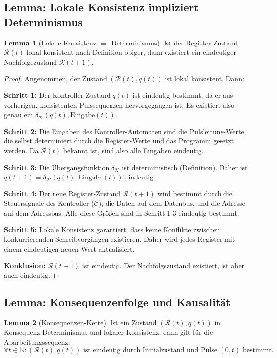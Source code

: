 \documentclass[a4paper,12pt]{article}
\theoremstyle{definition}
\newtheorem{lemma}{Lemma}
\begin{document}
\subsection{Lemma: Lokale Konsistenz impliziert Determinismus}

\begin{lemma}[Lokale Konsistenz $\Rightarrow$ Determinismus]
	\label{lem:lokale_konsistenz}
	Ist der Register-Zustand $\mathcal{R}(t)$ lokal konsistent nach Definition obiger, dann existiert ein eindeutiger Nachfolgezustand $\mathcal{R}(t+1)$.
\end{lemma}

\begin{proof}
	Angenommen, der Zustand $(\mathcal{R}(t), q(t))$ ist lokal konsistent. Dann:
	
	\textbf{Schritt 1:} Der Kontroller-Zustand $q(t)$ ist eindeutig bestimmt, da er aus vorherigen, konsistenten Pulssequenzen hervorgegangen ist. Es existiert also genau ein $\delta_{\mathcal{K}}(q(t), \text{Eingabe}(t))$.
	
	\textbf{Schritt 2:} Die Eingaben des Kontroller-Automaten sind die Pulsleitung-Werte, die selbst determiniert durch die Register-Werte und das Programm gesetzt werden. Da $\mathcal{R}(t)$ bekannt ist, sind also alle Eingaben eindeutig.
	
	\textbf{Schritt 3:} Die Übergangsfunktion $\delta_{\mathcal{K}}$ ist deterministisch (Definition). Daher ist $q(t+1) = \delta_{\mathcal{K}}(q(t), \text{Eingabe}(t))$ eindeutig.
	
	\textbf{Schritt 4:} Der neue Register-Zustand $\mathcal{R}(t+1)$ wird bestimmt durch die Steuersignale des Kontroller ($\mathcal{C}$), die Daten auf dem Datenbus, und die Adresse auf dem Adressbus. Alle diese Größen sind in Schritt 1-3 eindeutig bestimmt.
	
	\textbf{Schritt 5:} Lokale Konsistenz garantiert, dass keine Konflikte zwischen konkurrierenden Schreibvorgängen existieren. Daher wird jedes Register mit einem eindeutigen neuen Wert aktualisiert.
	
	\textbf{Konklusion:} $\mathcal{R}(t+1)$ ist eindeutig. Der Nachfolgezustand existiert, ist aber auch eindeutig.
\end{proof}

\subsection{Lemma: Konsequenzenfolge und Kausalität}

\begin{lemma}[Konsequenzen-Kette]
	\label{lem:konsequenzen_kette}
	Ist ein Zustand $(\mathcal{R}(t), q(t))$ in Konsequenz-Determinismus und lokaler Konsistenz, dann gilt für die Abarbeitungssequenz:
	\[
	\forall t \in \mathbb{N}: (\mathcal{R}(t), q(t)) \text{ ist eindeutig durch Initialzustand und Pulse } (0, t) \text{ bestimmt.}
	\]
\end{lemma}
\end{document}
